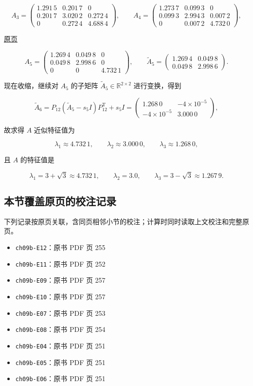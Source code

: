 \documentclass[
  10pt,
  fontset=fandol]{ctexart}
\providecommand{\tightlist}{%
  \setlength{\itemsep}{0pt}\setlength{\parskip}{0pt}}
\begin{document}
\[
A_3=\begin{pmatrix}
1.291\,5&0.201\,7&0\\
0.201\,7&3.020\,2&0.272\,4\\
0&0.272\,4&4.688\,4
\end{pmatrix},\qquad
A_4=\begin{pmatrix}
1.273\,7&0.099\,3&0\\
0.099\,3&2.994\,3&0.007\,2\\
0&0.007\,2&4.732\,0
\end{pmatrix},
\]

\href{../../source-images/pdf-259.jpeg}{原页}

\[
A_5=\begin{pmatrix}
1.269\,4&0.049\,8&0\\
0.049\,8&2.998\,6&0\\
0&0&\boxed{4.732\,1}
\end{pmatrix},\qquad
\widetilde A_5=\begin{pmatrix}1.269\,4&0.049\,8\\0.049\,8&2.998\,6\end{pmatrix}.
\]

现在收缩，继续对 \(A_5\) 的子矩阵 \(\widetilde A_5\in\mathbb R^{2\times2}\) 进行变换，得到

\[
\widetilde A_6=P_{12}(\widetilde A_5-s_5I)P_{12}^{\mathrm T}+s_5I
=\begin{pmatrix}\boxed{1.268\,0}&-4\times10^{-5}\\-4\times10^{-5}&\boxed{3.000\,0}\end{pmatrix},
\]

故求得 \(A\) 近似特征值为

\[
\lambda_1\approx4.732\,1,\qquad\lambda_2\approx3.000\,0,\qquad\lambda_3\approx1.268\,0,
\]

且 \(A\) 的特征值是

\[
\lambda_1=3+\sqrt3\approx4.732\,1,\qquad\lambda_2=3.0,\qquad\lambda_3=3-\sqrt3\approx1.267\,9.
\]

\subsection{本节覆盖原页的校注记录}\label{ux672cux8282ux8986ux76d6ux539fux9875ux7684ux6821ux6ce8ux8bb0ux5f55}

下列记录按原页关联，含同页相邻小节的校注；计算时同时读取上文校注和完整原页。

\begin{itemize}
\tightlist
\item
  \texttt{ch09b-E12}：原书 PDF 页 255
\item
  \texttt{ch09b-E11}：原书 PDF 页 252
\item
  \texttt{ch09b-E09}：原书 PDF 页 257
\item
  \texttt{ch09b-E10}：原书 PDF 页 257
\item
  \texttt{ch09b-E07}：原书 PDF 页 253
\item
  \texttt{ch09b-E08}：原书 PDF 页 254
\item
  \texttt{ch09b-E04}：原书 PDF 页 251
\item
  \texttt{ch09b-E05}：原书 PDF 页 251
\item
  \texttt{ch09b-E06}：原书 PDF 页 251
\end{itemize}
\end{document}
